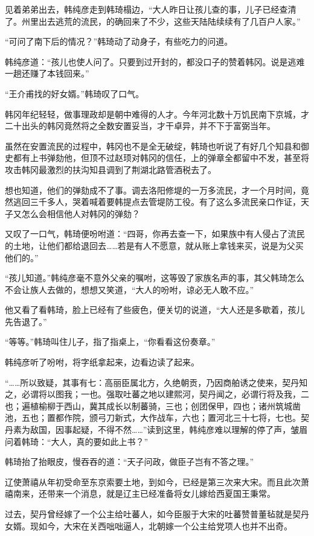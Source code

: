 见着弟弟出去，韩纯彦走到韩琦榻边，“大人昨日让孩儿查的事，儿子已经查清了。州里出去逃荒的流民，的确回来了不少，这些天陆陆续续有了几百户人家。”

“可问了南下后的情况？”韩琦动了动身子，有些吃力的问道。

韩纯彦道：“孩儿也使人问了。只要到过开封的，都没口子的赞着韩冈。说是逃难一趟还赚了本钱回来。”

“王介甫找的好女婿。”韩琦叹了口气。

韩冈年纪轻轻，做事理政却是朝中难得的人才。今年河北数十万饥民南下京城，才二十出头的韩冈竟然将之全数安置妥当，才干卓异，并不下于富弼当年。

虽然在安置流民的过程中，韩冈也不是全无破绽，韩琦也听说了有好几个知县和御史都有上书弹劾他，但顶不过赵顼对韩冈的信任，上的弹章全都留中不发，甚至将攻击韩冈最激烈的扶沟知县调到了荆湖北路管酒税去了。

想也知道，他们的弹劾成不了事。调去洛阳修堤的一万多流民，才一个月时间，竟然逃回三千多人，哭着喊着要韩提点去管堤防工役。有了这么多流民亲口作证，天子又怎么会相信他人对韩冈的弹劾？

又叹了一口气，韩琦便吩咐道：“四哥，你再去查一下，如果族中有人侵占了流民的土地，让他们都给退回去……若是有人不愿意，就从账上拿钱来买，说是为父买他们的。”

“孩儿知道。”韩纯彦毫不意外父亲的嘱咐，这等毁了家族名声的事，其父韩琦怎么不会让族人去做的，想想又笑道，“大人的吩咐，谅必无人敢不应。”

他又看了看韩琦，脸上已经有了些疲色，便关切的说道，“大人还是多歇着，孩儿先告退了。”

“等等。”韩琦叫住儿子，指了指桌上，“你看看这份奏章。”

韩纯彦听了吩咐，将字纸拿起来，边看边读了起来。

“……所以致疑，其事有七：高丽臣属北方，久绝朝贡，乃因商舶诱之使来，契丹知之，必谓将以图我；一也。强取吐蕃之地以建熙河，契丹闻之，必谓行将及我，二也；遍植榆柳于西山，冀其成长以制蕃骑，三也；创团保甲，四也；诸州筑城凿池，五也；置都作院，颁弓刀新式，大作战车，六也；置河北三十七将，七也。契丹素为敌国，因事起疑，不得不然……”读到这里，韩纯彦难以理解的停了声，皱眉问着韩琦：“大人，真的要如此上书？”

韩琦抬了抬眼皮，慢吞吞的道：“天子问政，做臣子岂有不答之理。”

辽使萧禧从年初受命至东京索要土地，到如今，已经是第三次来大宋。而且此次萧禧南来，还带来一个消息，就是辽主已经准备将女儿嫁给西夏国王秉常。

过去，契丹曾经嫁了一个公主给吐蕃人，如今臣服于大宋的吐蕃赞普董毡就是契丹女婿。现如今，大宋在关西咄咄逼人，北朝嫁一个公主给党项人也并不出奇。

